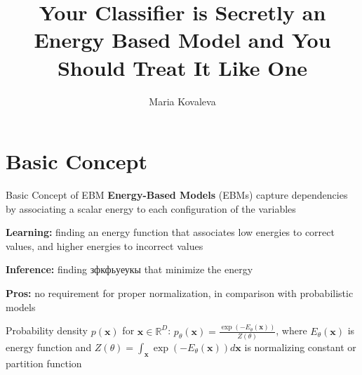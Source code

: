 \documentclass{beamer}
\title{Your Classifier is Secretly an Energy Based Model and You Should Treat It Like One}
\author{Maria Kovaleva}
\institute{MIPT, 2022}
\begin{document}
\begin{frame}
    \titlepage
\end{frame}


\begin{frame}
    \tableofcontents
\end{frame}


\section{Basic Concept}

\begin{frame}{Basic Concept of EBM}
    \textbf{Energy-Based Models} (EBMs) capture dependencies by associating a scalar energy to each conﬁguration of the variables
    
    \textbf{Learning:} ﬁnding an energy function that associates low energies to correct values, and higher energies to incorrect values
    
    \textbf{Inference:} finding зфкфьуеукы that minimize the energy
    
    \textbf{Pros:} no requirement for proper normalization, in comparison with probabilistic models
    
     \begin{block}{Probability density}
    $p(\mathbf{x})$ for $\mathbf{x}\in \mathbb{R}^{D}$:
    $ p_{\theta}(\mathbf{x}) = \frac{\exp{(-E_{\theta}(\mathbf{x}))}}{Z(\theta)}$, where $E_{\theta}(\mathbf{x})$ is energy function and $Z(\theta) = \int_{\mathbf{x}} \exp{(-E_{\theta}(\mathbf{x}))} d \mathbf{x}$ is normalizing constant or partition function
    \end{block}
    
   
\end{frame}
\end{document}

